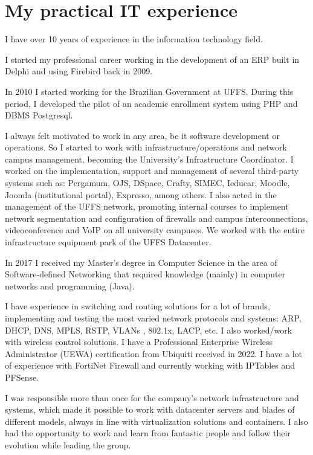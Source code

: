 \documentclass[11pt,a4paper,sans]{moderncv} %
\begin{document}
\vspace{1em}


\section{My practical IT experience}

I have over 10 years of experience in the information technology field. 

I started my professional career working in the development of an ERP built in Delphi and using Firebird back in 2009.

In 2010 I started working for the Brazilian Government at UFFS. During this period, I developed the pilot of an academic enrollment system using PHP and DBMS Postgresql.

I always felt motivated to work in any area, be it software development or operations. So I started to work with infrastructure/operations and network campus management, becoming the University's Infrastructure Coordinator. I worked on the implementation, support and management of several third-party systems such as: Pergamum, OJS, DSpace, Crafty, SIMEC, Ieducar, Moodle, Joomla (institutional portal), Expresso, among others. I also acted in the management of the UFFS network, promoting internal courses to implement network segmentation and configuration of firewalls and campus interconnections, videoconference and VoIP on all university campuses. We worked with the entire infrastructure equipment park of the UFFS Datacenter.

In 2017 I received my Master's degree in Computer Science in the area of Software-defined Networking that required knowledge (mainly) in computer networks and programming (Java).

I have experience in switching and routing solutions for a lot of brands, implementing and testing the most varied network protocols and systems: ARP, DHCP, DNS, MPLS, RSTP, VLANs , 802.1x, LACP, etc. I also worked/work with wireless control solutions. I have a Professional Enterprise Wireless Administrator (UEWA) certification from Ubiquiti received in 2022. I have a lot of experience with FortiNet Firewall and currently working with IPTables and PFSense.

I was responsible more than once for the company's network infrastructure and systems, which made it possible to work with datacenter servers and blades of different models, always in line with virtualization solutions and containers. I also had the opportunity to work and learn from fantastic people and follow their evolution while leading the group.
\end{document}
